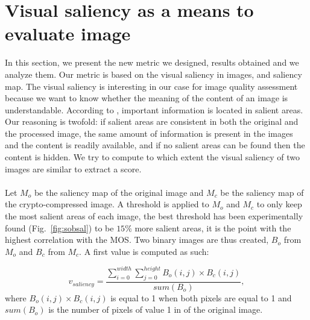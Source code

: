 \documentclass{article}
\begin{document}
\section{Visual saliency as a means to evaluate image}
\label{sec:metric}
In this section, we present the new metric we designed, results obtained and we analyze them. Our metric is based on the visual saliency in images, and saliency map. The visual saliency is interesting in our case for image quality assessment because we want to know whether the meaning of the content of an image is understandable. According to \cite{itti1998model}, important information is located in salient areas. Our reasoning is twofold: if salient areas are consistent in both the original and the processed image, the same amount of information is present in the images and the content is readily available, and if no salient areas can be found then the content is hidden. We try to compute to which extent the visual saliency of two images are similar to extract a score.

\paragraph*{}
Let $M_o$  be the saliency map of the original image and $M_c$ be the saliency map of the crypto-compressed image. A threshold is applied to $M_o$ and $M_c$ to only keep the most salient areas of each image, the best threshold has been experimentally found (Fig.~\ref{fig:sobsal}) to be $15\%$ more salient areas, it is the point with the highest correlation with the MOS. Two binary images are thus created, $B_o$ from $M_o$ and $B_c$ from $M_c$. A first value is computed as such:

\begin{equation}
  \label{eqn:eqn}
  v_{saliency} = \frac{\sum_{i=0}^{width}\sum_{j=0}^{height}{B_o(i,j) \times B_c(i,j)}}{sum(B_o)},
\end{equation}
where $B_o(i,j) \times B_c(i,j)$ is equal to 1 when both pixels are equal to 1 and $sum(B_o)$ is the number of pixels of value 1 in of the original image.
\end{document}
